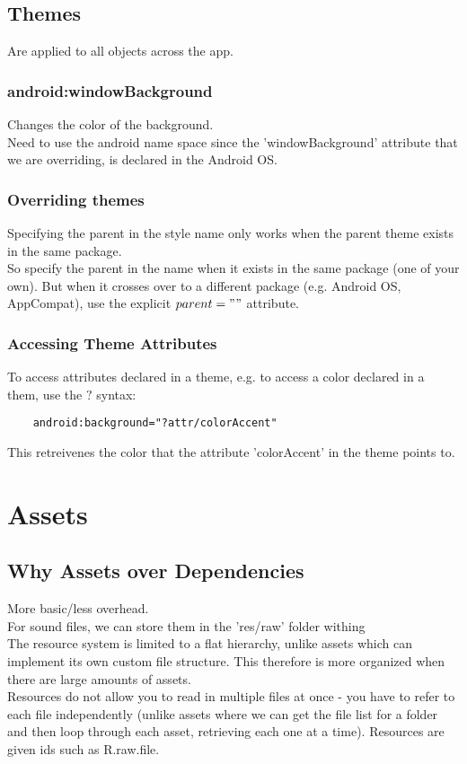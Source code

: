\documentclass[]{article}
\begin{document}
\subsection{Themes}
Are applied to all objects across the app.

\subsubsection{android:windowBackground}
Changes the color of the background.
\\
Need to use the android name space since the 'windowBackground' attribute that we are overriding, is declared in the Android OS.

\subsubsection{Overriding themes}
Specifying the parent in the style name only works when the parent theme exists in the same package.
\\
So specify the parent in the name when it exists in the same package (one of your own).  But when it crosses over to a different package (e.g. Android OS, AppCompat), use the explicit $ parent="" $ attribute.

\subsubsection{Accessing Theme Attributes}
To access attributes declared in a theme, e.g. to access a color declared in a them, use the $ ? $ syntax:
\begin{lstlisting}
	android:background="?attr/colorAccent"
\end{lstlisting}
This retreivenes the color that the attribute 'colorAccent' in the theme points to.

\section{Assets}
\subsection{Why Assets over Dependencies}
More basic/less overhead.
\\
For sound files, we can store them in the 'res/raw' folder withing 
\\
The resource system is limited to a flat hierarchy, unlike assets which can implement its own custom file structure.  This therefore is more organized when there are large amounts of assets.
\\
Resources do not allow you to read in multiple files at once - you have to refer to each file independently (unlike assets where we can get the file list for a folder and then  loop through each asset, retrieving each one at a time).  Resources are given ids such as R.raw.file.
\end{document}
